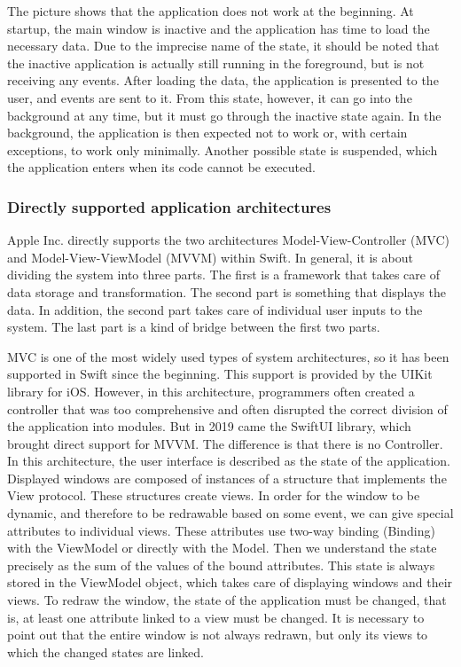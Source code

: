\documentclass[
  biblatex,
  language=english,
  figures=false,
  sourcecodes,
  glossaries,
  index
]{kidiplom}
\begin{document}
The picture shows that the application does not work at the beginning. At startup, the main window is inactive and the application has time to load the necessary data. Due to the imprecise name of the state, it should be noted that the inactive application is actually still running in the foreground, but is not receiving any events. After loading the data, the application is presented to the user, and events are sent to it. From this state, however, it can go into the background at any time, but it must go through the inactive state again. In the background, the application is then expected not to work or, with certain exceptions, to work only minimally. Another possible state is suspended, which the application enters when its code cannot be executed.

\subsubsection{Directly supported application architectures}
Apple Inc. directly supports the two architectures Model-View-Controller (MVC) and Model-View-ViewModel (MVVM) within Swift. In general, it is about dividing the system into three parts. The first is a framework that takes care of data storage and transformation. The second part is something that displays the data. In addition, the second part takes care of individual user inputs to the system. The last part is a kind of bridge between the first two parts.

MVC is one of the most widely used types of system architectures, so it has been supported in Swift since the beginning. This support is provided by the UIKit library for iOS. However, in this architecture, programmers often created a controller that was too comprehensive and often disrupted the correct division of the application into modules. But in 2019 came the SwiftUI library, which brought direct support for MVVM. 
The difference is that there is no Controller. In this architecture, the user interface is described as the state of the application. Displayed windows are composed of instances of a structure that implements the View protocol. These structures create views. In order for the window to be dynamic, and therefore to be redrawable based on some event, we can give special attributes to individual views. These attributes use two-way binding (Binding) with the ViewModel or directly with the Model. Then we understand the state precisely as the sum of the values of the bound attributes. This state is always stored in the ViewModel object, which takes care of displaying windows and their views. To redraw the window, the state of the application must be changed, that is, at least one attribute linked to a view must be changed. It is necessary to point out that the entire window is not always redrawn, but only its views to which the changed states are linked.
\end{document}
